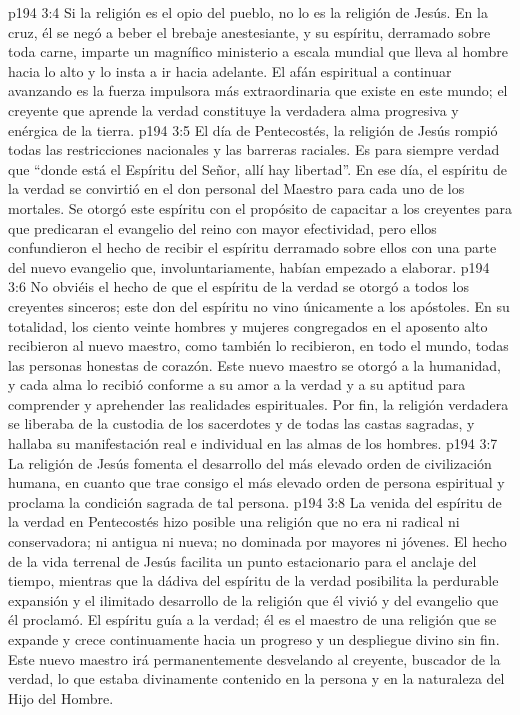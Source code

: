 \vs p194 3:4 Si la religión es el opio del pueblo, no lo es la religión de Jesús. En la cruz, él se negó a beber el brebaje anestesiante, y su espíritu, derramado sobre toda carne, imparte un magnífico ministerio a escala mundial que lleva al hombre hacia lo alto y lo insta a ir hacia adelante. El afán espiritual a continuar avanzando es la fuerza impulsora más extraordinaria que existe en este mundo; el creyente que aprende la verdad constituye la verdadera alma progresiva y enérgica de la tierra.
\vs p194 3:5 El día de Pentecostés, la religión de Jesús rompió todas las restricciones nacionales y las barreras raciales. Es para siempre verdad que “donde está el Espíritu del Señor, allí hay libertad”. En ese día, el espíritu de la verdad se convirtió en el don personal del Maestro para cada uno de los mortales. Se otorgó este espíritu con el propósito de capacitar a los creyentes para que predicaran el evangelio del reino con mayor efectividad, pero ellos confundieron el hecho de recibir el espíritu derramado sobre ellos con una parte del nuevo evangelio que, involuntariamente, habían empezado a elaborar.
\vs p194 3:6 \pc No obviéis el hecho de que el espíritu de la verdad se otorgó a todos los creyentes sinceros; este don del espíritu no vino únicamente a los apóstoles. En su totalidad, los ciento veinte hombres y mujeres congregados en el aposento alto recibieron al nuevo maestro, como también lo recibieron, en todo el mundo, todas las personas honestas de corazón. Este nuevo maestro se otorgó a la humanidad, y cada alma lo recibió conforme a su amor a la verdad y a su aptitud para comprender y aprehender las realidades espirituales. Por fin, la religión verdadera se liberaba de la custodia de los sacerdotes y de todas las castas sagradas, y hallaba su manifestación real e individual en las almas de los hombres.
\vs p194 3:7 \pc La religión de Jesús fomenta el desarrollo del más elevado orden de civilización humana, en cuanto que trae consigo el más elevado orden de persona espiritual y proclama la condición sagrada de tal persona.
\vs p194 3:8 La venida del espíritu de la verdad en Pentecostés hizo posible una religión que no era ni radical ni conservadora; ni antigua ni nueva; no dominada por mayores ni jóvenes. El hecho de la vida terrenal de Jesús facilita un punto estacionario para el anclaje del tiempo, mientras que la dádiva del espíritu de la verdad posibilita la perdurable expansión y el ilimitado desarrollo de la religión que él vivió y del evangelio que él proclamó. El espíritu guía a  la verdad; él es el maestro de una religión que se expande y crece continuamente hacia un progreso y un despliegue divino sin fin. Este nuevo maestro irá permanentemente desvelando al creyente, buscador de la verdad, lo que estaba divinamente contenido en la persona y en la naturaleza del Hijo del Hombre.
